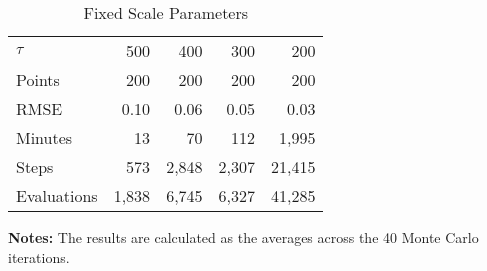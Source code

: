 \begin{table}\onehalfspacing
\begin{center}
\begin{threeparttable}
  \captionsetup{width=30cm}
  \caption{Fixed Scale Parameters}
  \label{Fixed Scale Parameters}
  \begin{tabular}{lrrrr}\toprule
  $\tau$ & 500 &  400 &   300 & 200 \\
  Points      & 200 & 200 & 200  & 200 \\
  \midrule
  RMSE        & 0.10 &   0.06 &    0.05 &  0.03  \\
  Minutes     &  13 &      70 &    112 &   1,995 \\
  Steps       &  573 &   2,848 &    2,307 &  21,415 \\
  Evaluations & 1,838 &   6,745 &    6,327 &  41,285 \\
  \bottomrule
  \end{tabular}\scriptsize
\begin{tablenotes}\item \textbf{Notes:}   The results are calculated as the averages across the 40 Monte Carlo iterations.
\end{tablenotes}
  \end{threeparttable}
  \end{center}
\end{table}
